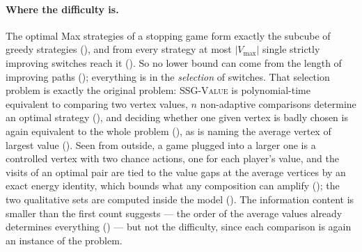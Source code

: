 \documentclass[11pt]{article}
\theoremstyle{plain}
\theoremstyle{definition}
\newcommand{\Vmax}{V_{\max}}
\begin{document}
\paragraph{Where the difficulty is.} The optimal Max strategies of a
stopping game form exactly the subcube of greedy strategies
(), and from every strategy at most $|\Vmax|$
single strictly improving switches reach it (). So
no lower bound can come from the length of improving paths
(); everything is in the \emph{selection} of
switches. That selection problem is exactly the original problem:
\textsc{SSG-Value} is polynomial-time equivalent to comparing two vertex
values, $n$ non-adaptive comparisons determine an optimal strategy
(), and deciding whether one given vertex
is badly chosen is again equivalent to the whole problem
(), as is naming the average vertex of
largest value (). Seen from outside, a game plugged into a
larger one is a controlled vertex with two chance actions, one for each
player's value, and the visits of an optimal pair are tied to the value
gaps at the average vertices by an exact energy identity, which bounds
what any composition can amplify (); the two
qualitative sets are computed inside the model (). The information content is smaller than the
first count suggests --- the order of the average values already determines
everything () --- but not the difficulty, since
each comparison is again an instance of the problem.
\end{document}
